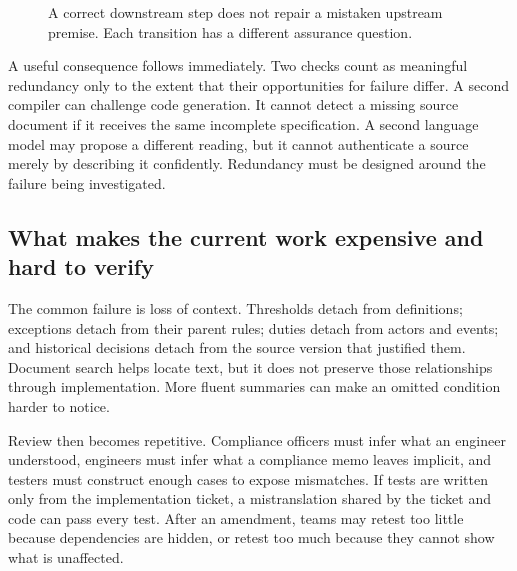 \documentclass[12pt,a4paper,oneside,openany]{book}
\begin{document}
\begin{figure}[htbp]
\centering
{}
\caption{A correct downstream step does not repair a mistaken upstream premise.
Each transition has a different assurance question.}
\label{fig:assurance-chain}
\end{figure}

A useful consequence follows immediately. Two checks count as meaningful
redundancy only to the extent that their opportunities for failure differ. A
second compiler can challenge code generation. It cannot detect a missing source
document if it receives the same incomplete specification. A second language
model may propose a different reading, but it cannot authenticate a source merely
by describing it confidently. Redundancy must be designed around the failure
being investigated.

\subsection{What makes the current work expensive and hard to verify}
\label{merge:P-01-problem:05}


The common failure is loss of context. Thresholds detach from definitions;
exceptions detach from their parent rules; duties detach from actors and events;
and historical decisions detach from the source version that justified them.
Document search helps locate text, but it does not preserve those relationships
through implementation. More fluent summaries can make an omitted condition
harder to notice.

Review then becomes repetitive. Compliance officers must infer what an engineer
understood, engineers must infer what a compliance memo leaves implicit, and
testers must construct enough cases to expose mismatches. If tests are written
only from the implementation ticket, a mistranslation shared by the ticket and
code can pass every test. After an amendment, teams may retest too little because
dependencies are hidden, or retest too much because they cannot show what is
unaffected.
\end{document}

